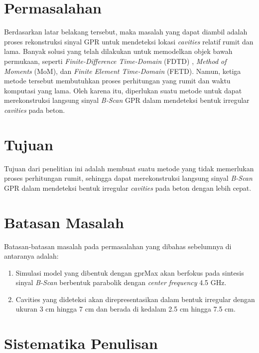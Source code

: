 \section{Permasalahan}
\label{sec:permasalahan}

Berdasarkan latar belakang tersebut, maka masalah yang dapat diambil adalah proses rekonstruksi sinyal GPR untuk mendeteksi lokasi \emph{cavities} relatif rumit dan lama. 
Banyak solusi yang telah dilakukan untuk memodelkan objek bawah permukaan, seperti \emph{Finite-Difference Time-Domain} (FDTD) \parencite{FDTD}, \emph{Method of Moments} (MoM)\parencite{MoM}, dan \emph{Finite Element Time-Domain} (FETD)\parencite{FETD}. 
Namun, ketiga metode tersebut membutuhkan proses perhitungan yang rumit dan waktu komputasi yang lama. 
Oleh karena itu, diperlukan suatu metode untuk dapat merekonstruksi langsung sinyal \emph{B-Scan} GPR dalam mendeteksi bentuk irregular \emph{cavities} pada beton.

\section{Tujuan}
\label{sec:Tujuan}

Tujuan dari penelitian ini adalah membuat suatu metode yang tidak memerlukan proses perhitungan rumit, sehingga dapat merekonstruksi langsung sinyal \emph{B-Scan} GPR dalam mendeteksi bentuk irregular \emph{cavities} pada beton dengan lebih cepat.

\section{Batasan Masalah}
\label{sec:batasanmasalah}

Batasan-batasan masalah pada permasalahan yang dibahas sebelumnya di antaranya adalah:

\begin{enumerate}[nolistsep]

  \item Simulasi model yang dibentuk dengan gprMax akan berfokus pada sintesis sinyal \emph{B-Scan} berbentuk parabolik dengan \emph{center frequency} 4.5 GHz.

  \item Cavities yang dideteksi akan direpresentasikan dalam bentuk irregular dengan ukuran 3 cm hingga 7 cm dan berada di kedalam 2.5 cm hingga 7.5 cm.

\end{enumerate}

\section{Sistematika Penulisan}
\label{sec:sistematikapenulisan}

